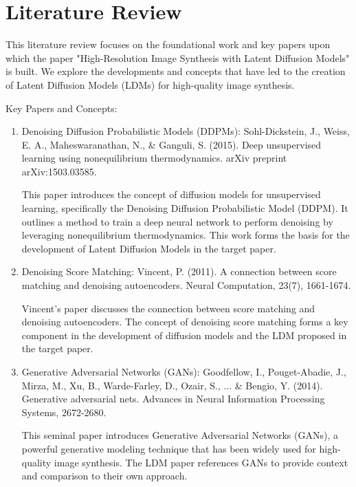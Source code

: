 \documentclass{article}
\begin{document}
\newpage
\section{Literature Review}
This literature review focuses on the foundational work and key papers upon which the paper "High-Resolution Image Synthesis with Latent Diffusion Models" is built. We explore the developments and concepts that have led to the creation of Latent Diffusion Models (LDMs) for high-quality image synthesis.

Key Papers and Concepts:

\begin{enumerate}
    \item Denoising Diffusion Probabilistic Models (DDPMs):
Sohl-Dickstein, J., Weiss, E. A., Maheswaranathan, N., \& Ganguli, S. (2015). Deep unsupervised learning using nonequilibrium thermodynamics. arXiv preprint arXiv:1503.03585. \newline

This paper introduces the concept of diffusion models for unsupervised learning, specifically the Denoising Diffusion Probabilistic Model (DDPM). It outlines a method to train a deep neural network to perform denoising by leveraging nonequilibrium thermodynamics. This work forms the basis for the development of Latent Diffusion Models in the target paper. \newline

    \item Denoising Score Matching:
Vincent, P. (2011). A connection between score matching and denoising autoencoders. Neural Computation, 23(7), 1661-1674. \newline

Vincent's paper discusses the connection between score matching and denoising autoencoders. The concept of denoising score matching forms a key component in the development of diffusion models and the LDM proposed in the target paper. \newline

    \item Generative Adversarial Networks (GANs):
Goodfellow, I., Pouget-Abadie, J., Mirza, M., Xu, B., Warde-Farley, D., Ozair, S., ... \& Bengio, Y. (2014). Generative adversarial nets. Advances in Neural Information Processing Systems, 2672-2680. \newline

This seminal paper introduces Generative Adversarial Networks (GANs), a powerful generative modeling technique that has been widely used for high-quality image synthesis. The LDM paper references GANs to provide context and comparison to their own approach. \newline


\end{enumerate}
\end{document}
